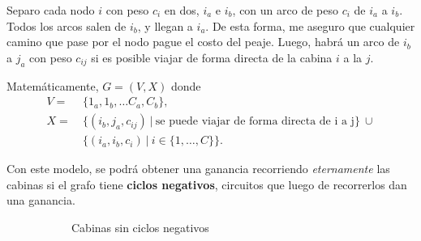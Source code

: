 \documentclass[12pt, a4paper]{report}
\theoremstyle{definition} %
\begin{document}
\begin{enumerate}[a)]
Separo cada nodo $i$ con peso $c_i$ en dos, $i_a$ e $i_b$, con un arco de peso $c_i$ de $i_a$ a $i_b$. Todos los arcos salen de $i_b$, y llegan a $i_a$. De esta forma, me aseguro que cualquier camino que pase por el nodo pague el costo del peaje. Luego, habrá un arco de $i_b$ a $j_a$ con peso $c_{ij}$ si es posible viajar de forma directa de la cabina $i$ a la $j$.

Matemáticamente, $G = (V, X)$ donde
\begin{align*}
    V = \ &\{ 1_a, 1_b, \ldots C_a, C_b\},\\
    X = \ &\{ (i_b, j_a, c_{ij}) \ |\ \text{se puede viajar de forma directa de i a j} \}\ \cup\\
      &\{ (i_a, i_b, c_i) \ | \ i \in \{1, \ldots, C\}\}.
\end{align*}

Con este modelo, se podrá obtener una ganancia recorriendo \textit{eternamente} las cabinas si el grafo tiene \textbf{ciclos negativos}, circuitos que luego de recorrerlos dan una ganancia.

\begin{figure}[H]
    \centering
    \begin{subfigure}[b]{0.4\textwidth}
        \centering
        \caption{Cabinas sin ciclos negativos}
        \label{5/ej/sin}
    \end{subfigure}
    \begin{subfigure}[b]{0.4\textwidth}
        \centering
\end{subfigure}
\end{figure}
\end{enumerate}
\end{document}
